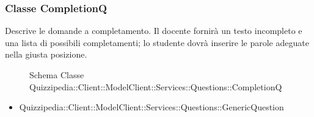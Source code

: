 \subsubsection{Classe CompletionQ}
Descrive le domande a completamento. Il docente fornirà un testo incompleto e una lista di possibili completamenti; lo studente dovrà inserire le parole adeguate nella giusta posizione.
\begin{figure}[H]
\centering
\noindent{}
\caption{Schema Classe Quizzipedia::Client::ModelClient::Services::Questions::CompletionQ}
\end{figure}
\begin{itemize}
\item Quizzipedia::Client::ModelClient::Services::Questions::GenericQuestion
\end{itemize}
